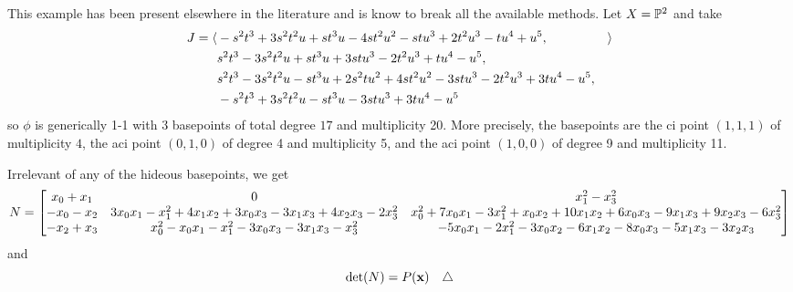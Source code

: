 \documentclass[fleqn,reqno]{amsart}
\begin{document}
\begin{example}[$\mt{ex310}$]
\label{ex310}
This example has been present elsewhere in the literature and is know to break all the available methods.
Let $X=\mathbb{P}^2$ and take
\begin{align*}
	J=\langle &-s^{2} t^{3}+3 s^{2} t^{2} u+s t^{3} u-4 s t^{2} u^{2}-s t
	      u^{3}+2 t^{2} u^{3}-t u^{4}+u^{5}, &\rangle\\
		  &s^{2} t^{3}-3 s^{2} t^{2} u+s t^{3} u+3 s t
	      u^{3}-2 t^{2} u^{3}+t u^{4}-u^{5},\\
		  &s^{2} t^{3}-3 s^{2} t^{2} u-s t^{3} u+2
	      s^{2} t u^{2}+4 s t^{2} u^{2}-3 s t u^{3}-2 t^{2} u^{3}+3 t u^{4}-u^{5},\\
		  &-s^{2}
	      t^{3}+3 s^{2} t^{2} u-s t^{3} u-3 s t u^{3}+3 t u^{4}-u^{5}
\end{align*}
so $\phi$ is generically 1-1 with 3 basepoints of total degree $17$
and multiplicity 20. More precisely, the basepoints are the ci point $(1,1,1)$ of multiplicity $4$,
the aci point $(0,1,0)$ of degree 4 and multiplicity 5, and
the aci point $(1,0,0)$ of degree 9 and multiplicity 11.

Irrelevant of any of the hideous basepoints, we get
\[
	N=\bgroup\begin{bmatrix}{x}_{0}+{x}_{1}&
      0&
      {x}_{1}^{2}-{x}_{3}^{2}\\
      -{x}_{0}-{x}_{2}&
      3 {x}_{0} {x}_{1}-{x}_{1}^{2}+4 {x}_{1} {x}_{2}+3 {x}_{0} {x}_{3}-3 {x}_{1} {x}_{3}+4 {x}_{2} {x}_{3}-2 {x}_{3}^{2}&
      {x}_{0}^{2}+7 {x}_{0} {x}_{1}-3 {x}_{1}^{2}+{x}_{0} {x}_{2}+10 {x}_{1} {x}_{2}+6 {x}_{0} {x}_{3}-9 {x}_{1} {x}_{3}+9 {x}_{2} {x}_{3}-6 {x}_{3}^{2}\\
      -{x}_{2}+{x}_{3}&
      {x}_{0}^{2}-{x}_{0} {x}_{1}-{x}_{1}^{2}-3 {x}_{0} {x}_{3}-3 {x}_{1} {x}_{3}-{x}_{3}^{2}&
      -5 {x}_{0} {x}_{1}-2 {x}_{1}^{2}-3 {x}_{0} {x}_{2}-6 {x}_{1} {x}_{2}-8 {x}_{0} {x}_{3}-5 {x}_{1} {x}_{3}-3 {x}_{2} {x}_{3}\\
      \end{bmatrix}\egroup
\]
and
\[
	\det(N)=P(\mathbf x) \demo
\]
\end{example}
\end{document}
